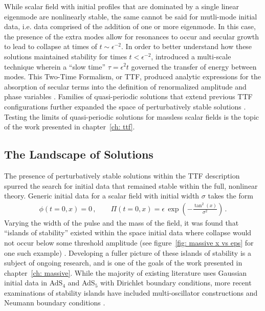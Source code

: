 \documentclass[../PhD.tex]{subfiles}
\begin{document}
While scalar field with initial profiles that are dominated by a single linear eigenmode are nonlinearly stable, the same cannot be said for mutli-mode initial data, i.e. data comprised of the addition of one or more eigenmode. In this case, the presence of the extra modes allow for resonances to occur and secular growth to lead to collapse at times of $t \sim \epsilon^{-2}$. In order to better understand how these solutions maintained stability for times $t < \epsilon^{-2}$, \cite{1403.6471} introduced a multi-scale technique wherein a ``slow time'' $\tau = \epsilon^2 t$ governed the transfer of energy between modes. This Two-Time Formalism, or TTF, produced analytic expressions for the absorption of secular terms into the definition of renormalized amplitude and phase variables \cite{1412.3249, 1412.4761,1510.07836}. Families of quasi-periodic solutions that extend previous TTF configurations further expanded the space of perturbatively stable solutions \cite{1410.2631, 1507.08261,  1706.07413, TTF}. Testing the limits of quasi-periodic solutions for massless scalar fields is the topic of the work presented in chapter~\ref{ch: ttf}.


\subsection{The Landscape of Solutions}
\label{ssec: scalar landscape}

The presence of perturbatively stable solutions within the TTF description spurred the search for initial data that remained stable within the full, nonlinear theory. Generic initial data for a scalar field with initial width $\sigma$ takes the form
\begin{align}
\label{scalar ics}
\phi(t=0, x) = 0 \, , \qquad \Pi(t=0, x) = \epsilon \, \exp \left( - \frac{ \tan^2 (x)}{\sigma^2} \right) \, .
\end{align}
Varying the width of the pulse and the mass of the field, it was found that ``islands of stability'' existed within the space initial data where collapse would not occur below some threshold amplitude (see figure~\ref{fig: massive x vs eps} for one such example) \cite{1508.02709, 1504.05203, 1711.00454, 1403.5434}. Developing a fuller picture of these islands of stability is a subject of ongoing research, and is one of the goals of the work presented in chapter~\ref{ch: massive}. While the majority of existing literature uses Gaussian initial data in AdS$_4$ and AdS$_5$ with Dirichlet boundary conditions, more recent examinations of stability islands have included multi-oscillator constructions and Neumann boundary conditions \cite{1803.02830, 1908.02296}.
\end{document}
